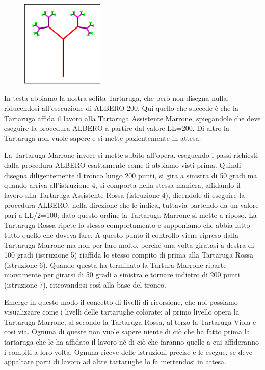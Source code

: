 \begin{minipage}{0.5\textwidth}
\begin{figure}[H]
   \includegraphics[width=4.0cm,trim=4 4 8 4,clip]{./images/magia-specchi/albero-fiorito.png}
   \label{tree-2}
\end{figure}
\end{minipage} \hfill
\begin{minipage}{0.4\textwidth}
In testa abbiamo la nostra solita Tartaruga, che però non disegna nulla, riducendosi all'esecuzione di ALBERO 200. Qui quello che succede è che la Tartaruga affida il lavoro alla Tartaruga Assistente Marrone, spiegandole che deve eseguire la procedura ALBERO a partire dal valore LL=200. Di altro la Tartaruga non vuole sapere e si mette pazientemente in attesa. 
\end{minipage}   

\vskip 0.5cm                    

La Tartaruga Marrone invece si mette subito all'opera, eseguendo i passi richiesti dalla procedura ALBERO esattamente come li abbiamo visti prima. Quindi disegna diligentemente il tronco lungo 200 punti, si gira a sinistra di 50 gradi ma quando arriva all'istruzione 4, si comporta nella stessa maniera, affidando il lavoro alla Tartaruga Assistente Rossa (istruzione 4), dicendole di eseguire la procedura ALBERO, nella direzione che le indica, tuttavia partendo da un valore pari a LL/2=100; dato questo ordine la Tartaruga Marrone si mette a riposo. La Tartaruga Rossa ripete lo stesso comportamento e supponiamo che abbia fatto tutto quello che doveva fare. A questo punto il controllo viene ripreso dalla Tartaruga Marrone ma non per fare molto, perché una volta giratasi a destra di 100 gradi (istruzione 5) riaffida lo stesso compito di prima alla Tartaruga Rossa (istruzione 6). Quando questa ha terminato la Tartura Marrone riparte nuovamente per girarsi di 50 gradi a sinistra e tornare indietro di 200 punti (istruzione 7), ritrovandosi così alla base del tronco.  

Emerge in questo modo il concetto di livelli di ricorsione, che noi possiamo visualizzare come i livelli delle tartarughe colorate: al primo livello opera la Tartaruga Marrone, al secondo la Tartaruga Rossa, al terzo la Tartaruga Viola e così via. Ognuna di queste non vuole sapere niente di ciò che ha fatto prima la tartaruga che le ha affidato il lavoro né di ciò che faranno quelle a cui affideranno i compiti a loro volta. Ognuna riceve delle istruzioni precise e le esegue, se deve appaltare parti di lavoro ad altre tartarughe lo fa mettendosi in attesa. 


